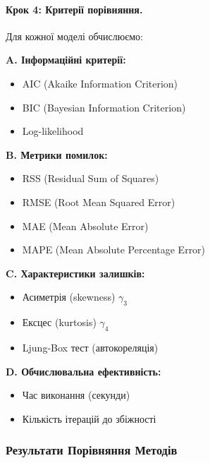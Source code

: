 \paragraph{Крок 4: Критерії порівняння.}
Для кожної моделі обчислюємо:

\textbf{A. Інформаційні критерії:}
\begin{itemize}
    \item AIC (Akaike Information Criterion)
    \item BIC (Bayesian Information Criterion)
    \item Log-likelihood
\end{itemize}

\textbf{B. Метрики помилок:}
\begin{itemize}
    \item RSS (Residual Sum of Squares)
    \item RMSE (Root Mean Squared Error)
    \item MAE (Mean Absolute Error)
    \item MAPE (Mean Absolute Percentage Error)
\end{itemize}

\textbf{C. Характеристики залишків:}
\begin{itemize}
    \item Асиметрія (skewness) $\gamma_3$
    \item Ексцес (kurtosis) $\gamma_4$
    \item Ljung-Box тест (автокореляція)
\end{itemize}

\textbf{D. Обчислювальна ефективність:}
\begin{itemize}
    \item Час виконання (секунди)
    \item Кількість ітерацій до збіжності
\end{itemize}

\subsubsection{Результати Порівняння Методів}
\label{subsubsec:wti_results}

